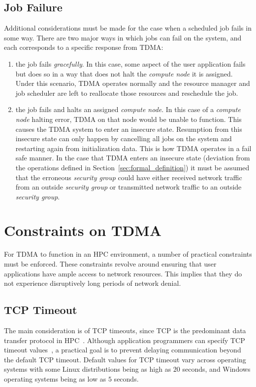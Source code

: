 \documentclass[oneside,12pt]{memoir}
\begin{document}
\subsection{Job Failure}
Additional considerations must be made for the case when a scheduled job fails in some way. There are two major ways in which jobs can fail on the system, and each corresponds to a specific response from TDMA:
\begin{enumerate}
\item the job fails \textit{gracefully}. In this case, some aspect of the user application fails but does so in a way that does not halt the \textit{compute node} it is assigned. Under this scenario, TDMA operates normally and the resource manager and job scheduler are left to reallocate those resources and reschedule the job. 
\item the job fails and halts an assigned \textit{compute node}. In this case of a \textit{compute node} halting error, TDMA on that node would be unable to function. This causes the TDMA system to enter an insecure state. Resumption from this insecure state can only happen by cancelling all jobs on the system and restarting again from initialization data. This is how TDMA operates in a fail safe manner. In the case that TDMA enters an insecure state (deviation from the operations defined in Section~\ref{sec:formal_definition}) it must be assumed that the erroneous \textit{security group} could have either received network traffic from an outside \textit{security group} or transmitted network traffic to an outside \textit{security group}.
\end{enumerate}

\section{Constraints on TDMA}
\label{sec:constraints}
For TDMA to function in an HPC environment, a number of practical constraints must be enforced. These constraints revolve around ensuring that user applications have ample access to network resources. This implies that they do not experience disruptively long periods of network denial. 
\subsection{TCP Timeout}
The main consideration is of TCP timeouts, since TCP is the predominant data transfer protocol in HPC~\cite{allcock2002data}. Although application programmers can specify TCP timeout values~\cite{eggert2009tcp}, a practical goal is to prevent delaying communication beyond the default TCP timeout. Default values for TCP timeout vary across operating systems with some Linux distributions being as high as $20$ seconds, and Windows operating systems being as low as $5$ seconds.
\end{document}
